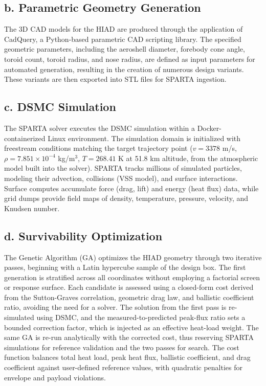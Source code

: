\subsection*{b. Parametric Geometry Generation}
The 3D CAD models for the HIAD are produced through the application of CadQuery, a Python-based parametric CAD scripting library. The specified geometric parameters, including the aeroshell diameter, forebody cone angle, toroid count, toroid radius, and nose radius, are defined as input parameters for automated generation, resulting in the creation of numerous design variants. These variants are then exported into STL files for SPARTA ingestion.

\subsection*{c. DSMC Simulation}
The SPARTA solver executes the DSMC simulation within a Docker-containerized Linux environment. The simulation domain is initialized with freestream conditions matching the target trajectory point ($v = 3378$ m/s, $\rho = 7.851 \times 10^{-4}$ kg/m$^3$, $T = 268.41$ K at 51.8 km altitude, from the atmospheric model built into the solver). SPARTA tracks millions of simulated particles, modeling their advection, collisions (VSS model), and surface interactions. Surface computes accumulate force (drag, lift) and energy (heat flux) data, while grid dumps provide field maps of density, temperature, pressure, velocity, and Knudsen number.


\subsection*{d. Survivability Optimization}
The Genetic Algorithm (GA) optimizes the HIAD geometry through two iterative passes, beginning with a Latin hypercube sample of the design box. The first generation is stratified across all coordinates without employing a factorial screen or response surface. Each candidate is assessed using a closed-form cost derived from the Sutton-Graves correlation, geometric drag law, and ballistic coefficient ratio, avoiding the need for a solver. The solution from the first pass is re-simulated using DSMC, and the measured-to-predicted peak-flux ratio sets a bounded correction factor, which is injected as an effective heat-load weight. The same GA is re-run analytically with the corrected cost, thus reserving SPARTA simulations for reference validation and the two passes for search. The cost function balances total heat load, peak heat flux, ballistic coefficient, and drag coefficient against user-defined reference values, with quadratic penalties for envelope and payload violations.

